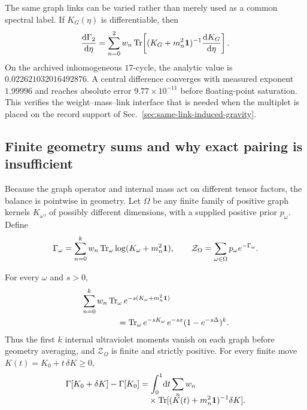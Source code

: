 The same graph links can be varied rather than merely used as a common
spectral label.  If \(K_G(\eta)\) is differentiable, then
\begin{equation}
 \frac{\mathrm d\Gamma_2}{\mathrm d\eta}
 =\sum_{n=0}^{2}w_n
 \operatorname{Tr}\!\left[
 (K_G+m_n^2\mathbf1)^{-1}\frac{\mathrm d K_G}{\mathrm d\eta}\right].
 \label{eq:ph-same-link}
\end{equation}
On the archived inhomogeneous \(17\)-cycle, the analytic value is
\(0.022621032016492876\).  A central difference converges with measured
exponent \(1.99996\) and reaches absolute error
\(9.77\times10^{-11}\) before floating-point saturation.  This verifies
the weight--mass--link interface that is needed when the multiplet is
placed on the record support of Sec.~\ref{sec:same-link-induced-gravity}.

\subsection{Finite geometry sums and why exact pairing is insufficient}

Because the graph operator and internal mass act on different tensor
factors, the balance is pointwise in geometry.  Let \(\Omega\) be any finite
family of positive graph kernels \(K_\omega\), of possibly different
dimensions, with a supplied positive prior \(p_\omega\).  Define
\begin{equation}
 \Gamma_\omega
 =\sum_{n=0}^{k}w_n\operatorname{Tr}_\omega\log(K_\omega+m_n^2\mathbf1),
 \qquad
 \mathcal Z_\Omega
 =\sum_{\omega\in\Omega}p_\omega e^{-\Gamma_\omega}.
 \label{eq:ph-graph-sum}
\end{equation}

\begin{proposition}
\label{prop:ph-graph-sum}
For every \(\omega\) and \(s>0\),
\begin{align}
 &\sum_{n=0}^{k}w_n
 \operatorname{Tr}_\omega e^{-s(K_\omega+m_n^2\mathbf1)}
 \nonumber\\
 &\hspace{1.5cm}
 =\operatorname{Tr}_\omega e^{-sK_\omega}\,
 e^{-sx}(1-e^{-s\Delta})^k .
 \label{eq:ph-graph-heat}
\end{align}
Thus the first \(k\) internal ultraviolet moments vanish on each graph
before geometry averaging, and \(\mathcal Z_\Omega\) is finite and strictly
positive.  For every finite move
\(K(t)=K_0+t\,\delta K\geq0\),
\begin{align}
 \Gamma[K_0+\delta K]-\Gamma[K_0]
 &=
 \int_0^1\!\mathrm d t\sum_n w_n
 \nonumber\\[-2mm]
 &\quad\times
 \operatorname{Tr}[(K(t)+m_n^2\mathbf1)^{-1}\delta K] .
 \label{eq:ph-finite-move}
\end{align}
\end{proposition}

